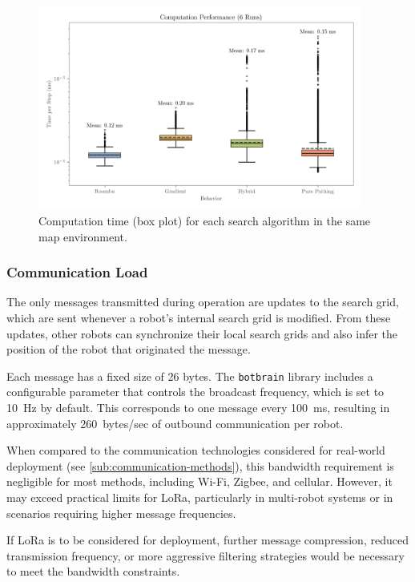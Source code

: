 \begin{figure}[H]
    \begin{center}
        \includegraphics[width=0.95\textwidth]{./figures/plots/computation-performance-(6-runs).png}
    \end{center}
    \caption{Computation time (box plot) for each search algorithm in the same map environment.}
    \label{fig:computation-performance}
\end{figure}

\subsubsection{Communication {\color{red}Load}}
The only messages transmitted during operation are updates to the search grid, which are sent whenever a robot’s internal search grid is modified. From these updates, other robots can synchronize their local search grids and also infer the position of the robot that originated the message.

Each message has a fixed size of 26 bytes. The \texttt{botbrain} library includes a configurable parameter that controls the broadcast frequency, which is set to \SI{10}{Hz} by default. This corresponds to one message every \SI{100}{ms}, resulting in approximately \SI{260}{bytes/sec} of outbound communication per robot.

When compared to the communication technologies considered for real-world deployment (see \cref{sub:communication-methods}), this bandwidth requirement is negligible for most methods, including Wi-Fi, Zigbee, and cellular. However, it may exceed practical limits for LoRa, particularly in multi-robot systems or in scenarios requiring higher message frequencies.

If LoRa is to be considered for deployment, further message compression, reduced transmission frequency, or more aggressive filtering strategies would be necessary to meet the bandwidth constraints.


